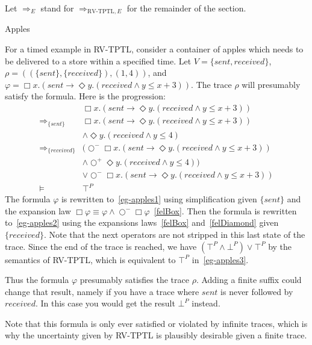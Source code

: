 \documentclass[a4paper]{article}
\newcommand{\sn}{\bigcirc^+}
\newcommand{\wn}{\bigcirc^-}
\newcommand{\rw}[1]{\Rightarrow_{#1}}
\begin{document}
Let $\rw{E}$ stand for $\rw{\text{RV-TPTL},E}$ for the remainder of the section.

\begin{eg}{Apples}

  For a timed example in RV-TPTL, consider a container of apples which needs to be delivered to a store within a specified time. Let $V=\{sent, received\}$, \(\rho=((\{sent\},\{received\}),(1,4))\), and \(\varphi=\Box x. (sent \to \Diamond y. (received \land y \leq x + 3))\).
  The trace $\rho$ will presumably satisfy the formula.
  Here is the progression:
  \begin{align}
    &\Box x. (sent \to \Diamond y. (received \land y \leq x + 3))\nonumber\\
    \rw{\{sent\}}
    &\Box x. (sent \to \Diamond y. (received \land y \leq x + 3))\nonumber\\
    &\land \Diamond y. (received \land y \leq 4)
    \label{eg-apples1}\\
    \rw{\{received\}}
    &(\wn \Box x. (sent \to \Diamond y. (received \land y \leq x + 3))\nonumber\\
    &\land \sn \Diamond y. (received \land y \leq 4))\nonumber\\
    &\lor \wn \Box x. (sent \to \Diamond y. (received \land y \leq x + 3))\label{eg-apples2}\\
    \vDash
    &\top^P\label{eg-apples3}
  \end{align}
  The formula $\varphi$ is rewritten to~\eqref{eg-apples1} using simplification given $\{sent\}$ and the expansion law $\Box \varphi \equiv \varphi \land \wn \Box \varphi$~\eqref{felBox}.
  Then the formula is rewritten to~\eqref{eg-apples2} using the expansions laws~\eqref{felBox} and~\eqref{felDiamond} given $\{received\}$.
  Note that the next operators are not stripped in this last state of the trace.
  Since the end of the trace is reached, we have $(\top^P \land \bot^P) \lor \top^P$ by the semantics of RV-TPTL, which is equivalent to $\top^P$ in~\eqref{eg-apples3}.

  Thus the formula $\varphi$ presumably satisfies the trace $\rho$.
  Adding a finite suffix could change that result, namely if you have a trace where $sent$ is never followed by $received$.
  In this case you would get the result $\bot^P$ instead.

  Note that this formula is only ever satisfied or violated by infinite traces, which is why the uncertainty given by RV-TPTL is plausibly desirable given a finite trace.
\end{eg}
\end{document}
